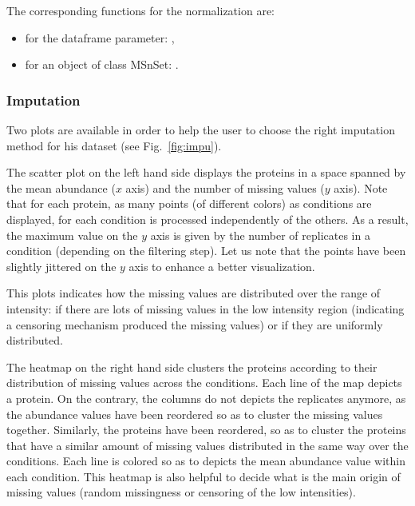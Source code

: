 \documentclass[12pt]{article}
\begin{document}
The corresponding functions for the normalization are:
\begin{itemize}
\item for the dataframe parameter: ,
\item for an object of class MSnSet: .
\end{itemize}

\subsubsection{Imputation}\label{imputation}

Two plots are available in order to help the user to choose the right 
imputation method for his dataset (see Fig.~\ref{fig:impu}).


The scatter plot on the left hand side displays the proteins in a space 
spanned by the mean abundance ($x$ axis) and the number of missing values 
($y$ axis). Note that for each protein, as many points (of different colors) 
as conditions are displayed, for each condition is processed independently of 
the others. As a result, the maximum value on the $y$ axis is given by the 
number of replicates in a condition (depending on the filtering step). Let 
us note that the points have been slightly jittered on the $y$ axis to 
enhance a better visualization.

This plots indicates how the missing values are distributed over the range of 
intensity: if there are lots of missing values in the low intensity region 
(indicating a censoring mechanism produced the missing values) or if they are 
uniformly distributed. 


The heatmap on the right hand side clusters the proteins according to their 
distribution of missing values across the conditions. Each line of the map 
depicts a protein. On the contrary, the columns do not depicts the replicates 
anymore, as the abundance values have been reordered so as to cluster the 
missing values together. Similarly, the proteins have been reordered, so as 
to cluster the proteins that have a similar amount of missing values 
distributed in the same way over the conditions. Each line is colored so as 
to depicts the mean abundance value within each condition. This heatmap is 
also helpful to decide what is the main origin of missing values (random 
missingness or censoring of the low intensities).
\end{document}
